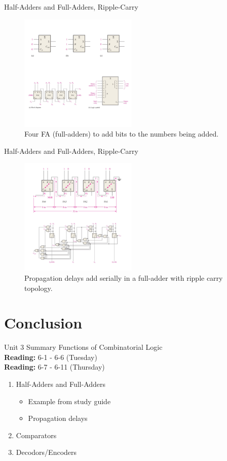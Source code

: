\documentclass{beamer}
\begin{document}
\begin{frame}{Half-Adders and Full-Adders, Ripple-Carry}
\begin{figure}
\centering
\includegraphics[width=0.5\textwidth]{figures/adder8.pdf}
\caption{\label{fig:add8} Four FA (full-adders) to add bits to the numbers being added.}
\end{figure}
\end{frame}

\begin{frame}{Half-Adders and Full-Adders, Ripple-Carry}
\begin{figure}
\centering
\includegraphics[width=0.5\textwidth]{figures/adder9.pdf}
\caption{\label{fig:add9} Propagation delays add serially in a full-adder with ripple carry topology.}
\end{figure}
\end{frame}

\section{Conclusion}

\begin{frame}{Unit 3 Summary}
\alert{Functions of Combinatorial Logic} \\
\textbf{Reading:} 6-1 - 6-6 (Tuesday) \\
\textbf{Reading:} 6-7 - 6-11 (Thursday)
\begin{enumerate}
\item Half-Adders and Full-Adders
\begin{itemize}
\item Example from study guide
\item Propagation delays
\end{itemize}
\item Comparators
\item Decodors/Encoders
\end{enumerate}
\end{frame}
\end{document}
